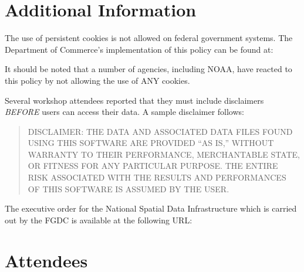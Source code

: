 \section{Additional Information}

The use of persistent cookies is not allowed on federal government
systems.  The Department of Commerce's implementation of this policy
can be found at: 


It should be noted that a number of agencies, including NOAA, have
reacted to this policy by not allowing the use of ANY cookies.

Several workshop attendees reported that they must include disclaimers
\emph{BEFORE} users can access their data.  A sample disclaimer follows:

\begin{quote}
DISCLAIMER: THE DATA AND ASSOCIATED DATA FILES FOUND USING THIS
SOFTWARE ARE PROVIDED ``AS IS,'' WITHOUT WARRANTY TO THEIR PERFORMANCE,
MERCHANTABLE STATE, OR FITNESS FOR ANY PARTICULAR PURPOSE. THE ENTIRE
RISK ASSOCIATED WITH THE RESULTS AND PERFORMANCES OF THIS SOFTWARE IS
ASSUMED BY THE USER.
\end{quote}

The executive order for the National Spatial Data Infrastructure which
is carried out by the FGDC is available at the following URL:




\section{Attendees}

